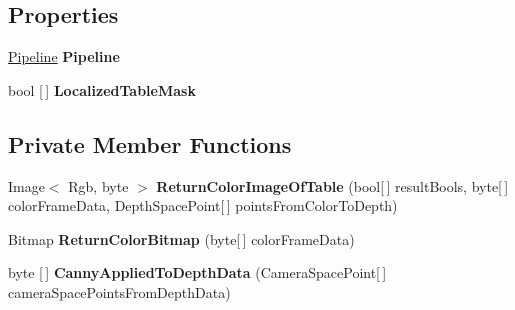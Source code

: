 \subsection*{Properties}
\begin{DoxyCompactItemize}
\item 
\mbox{\label{class_chess_tracking_1_1_image_processing_1_1_pipeline_parts_1_1_stages_1_1_plane_localization_a1c57a6318253afa76065caa14fc08c52}} 
\mbox{\hyperlink{class_chess_tracking_1_1_image_processing_1_1_pipeline_parts_1_1_general_1_1_pipeline}{Pipeline}} {\bfseries Pipeline}
\item 
\mbox{\label{class_chess_tracking_1_1_image_processing_1_1_pipeline_parts_1_1_stages_1_1_plane_localization_a03caff7aacd944e89217e6598d15d717}} 
bool \mbox{[}$\,$\mbox{]} {\bfseries Localized\+Table\+Mask}
\end{DoxyCompactItemize}
\subsection*{Private Member Functions}
\begin{DoxyCompactItemize}
\item 
\mbox{\label{class_chess_tracking_1_1_image_processing_1_1_pipeline_parts_1_1_stages_1_1_plane_localization_a859a6151b9572ea005925687a5535891}} 
Image$<$ Rgb, byte $>$ {\bfseries Return\+Color\+Image\+Of\+Table} (bool\mbox{[}$\,$\mbox{]} result\+Bools, byte\mbox{[}$\,$\mbox{]} color\+Frame\+Data, Depth\+Space\+Point\mbox{[}$\,$\mbox{]} points\+From\+Color\+To\+Depth)
\item 
\mbox{\label{class_chess_tracking_1_1_image_processing_1_1_pipeline_parts_1_1_stages_1_1_plane_localization_a925f50ed44cb2f8bbd4c0b6ab44be4e3}} 
Bitmap {\bfseries Return\+Color\+Bitmap} (byte\mbox{[}$\,$\mbox{]} color\+Frame\+Data)
\item 
\mbox{\label{class_chess_tracking_1_1_image_processing_1_1_pipeline_parts_1_1_stages_1_1_plane_localization_a2bf0d3c208b1cfca8ba843c2298c7f49}} 
byte \mbox{[}$\,$\mbox{]} {\bfseries Canny\+Applied\+To\+Depth\+Data} (Camera\+Space\+Point\mbox{[}$\,$\mbox{]} camera\+Space\+Points\+From\+Depth\+Data)
\end{DoxyCompactItemize}


